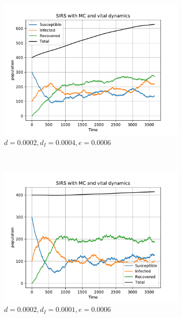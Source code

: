 \begin{figure}[H]
    \centering
    \begin{subfigure}{0.49\textwidth}
        \centering
        \includegraphics[width=\linewidth]{../fig/newfig/MC_vitaldynamic_d0002_dI0004_e0006.pdf}
        \caption{$d = 0.0002, d_I = 0.0004, e = 0.0006$}
    \end{subfigure}
     ~ 
    \begin{subfigure}{0.49\textwidth}
         \centering
         \includegraphics[width=\linewidth]{../fig/newfig/MC_vitaldynamic_d00002_dI0001_e00006.pdf}
         \caption{$d = 0.0002, d_I = 0.0001, e = 0.0006$}
    \end{subfigure}
     ~ 
    \begin{subfigure}{0.49\textwidth}

\end{subfigure}
\end{figure}
